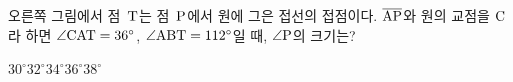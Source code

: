\noindent\begin{minipage}[t]{0.58\linewidth}\vspace{0pt}\raggedright 오른쪽 그림에서 점~$\mathrm{T}$는 점~$\mathrm{P}$에서 원에 그은 접선의 접점이다. $\overline{\mathrm{AP}}$와 원의 교점을 $\mathrm{C}$라 하면 $\angle\mathrm{CAT}=36^\circ$, $\angle\mathrm{ABT}=112^\circ$일 때, $\angle\mathrm{P}$의 크기는?\end{minipage}\hfill\begin{minipage}[t]{0.4\linewidth}\vspace{0pt}\centering \resizebox{\ifdim\width>\linewidth\linewidth\else\width\fi}{!}{}\end{minipage}\par
\begin{choices32}{$30^\circ$}{$32^\circ$}{$34^\circ$}{$36^\circ$}{$38^\circ$}\end{choices32}
